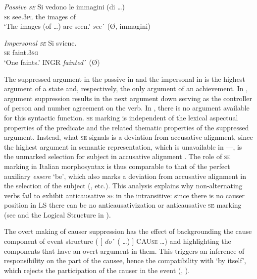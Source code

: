 \documentclass[output=paper,colorlinks,citecolor=brown
]{langscibook}
\begin{document}
\ea \label{bentley_example_51}
    \textit{Passive \textsc{se}}
    \ea \label{bentley_example_51a}
    \gll Si		vedono	le		immagini (di \ldots ) \\
    \textsc{se}		see.3\textsc{pl}		the	images		of \\
    \glt 	‘The images (of \ldots ) are seen.’
    \ex \label{bentley_example_51b}
    \textit{see}´ (Ø, immagini)
    \z
\z

\ea \label{bentley_example_52}
    \textit{Impersonal \textsc{se}}
    \ea \label{bentley_example_52a}
    \gll Si 	sviene.\\
    \textsc{se}		faint.3\textsc{sg}	 \\
    \glt 	‘One faints.’
    \ex \label{bentley_example_52b}
    INGR \textit{fainted}´ (Ø)
    \z
\z

The suppressed argument in the passive in  and the impersonal in  is the highest argument of a state and, respectively, the only argument of an achievement. In , argument suppression results in the next argument down serving as the controller of person and number agreement on the verb. In , there is no argument available for this syntactic function. \textsc{se} marking is independent of the lexical aspectual properties of the predicate and the related thematic properties of the suppressed argument. Instead, what \textsc{se} signals is a deviation from accusative alignment, since the highest argument in semantic representation, which is unavailable in —, is the unmarked selection for subject in accusative alignment \citep[175]{vanvalin1997syntax}. The role of \textsc{se} marking in Italian morphosyntax is thus comparable to that of the perfect auxiliary \textit{essere} ‘be’, which also marks a deviation from accusative alignment in the selection of the subject (\cite{lafauci1988oggetti,bentley2006split,ledgeway2012latin,loporcaro2016auxiliary}, etc.). This analysis explains why non-alternating verbs fail to exhibit anticausative \textsc{se} in the intransitive: since there is no causer position in LS there can be no anticausativization or anticausative \textsc{se} marking (see  and the Logical Structure in ).

The overt making of causer suppression has the effect of backgrounding the cause component of event structure ( $\lbrack$ \textit{do}´ ( \ldots ) $\rbrack$ CAU\textsc{se} \ldots ) and highlighting the components that have an overt argument in them. This triggers an inference of responsibility on the part of the causee, hence the compatibility with ‘by itself’, which rejects the participation of the causer in the event (, ). 
\end{document}
